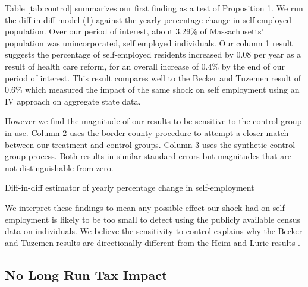 \documentclass[12pt]{article}
\begin{document}
Table \ref{tab:control} summarizes our first finding as a test of Proposition 1. We run the diff-in-diff model (1) against the yearly percentage change in self employed population. Over our period of interest, about 3.29\% of Massachusetts' population was unincorporated, self employed individuals. Our column 1 result suggests the percentage of self-employed residents increased by 0.08 per year as a result of health care reform, for an overall increase of 0.4\% by the end of our period of interest. This result compares well to the Becker and Tuzemen \cite{tuzemen} result of 0.6\% which measured the impact of the same shock on self employment using an IV approach on aggregate state data. 

However we find the magnitude of our results to be sensitive to the control group in use. Column 2 uses the border county procedure to attempt a closer match between our treatment and control groups. Column 3 uses the synthetic control group process. Both results in similar standard errors but magnitudes that are not distinguishable from zero. 
\begin{center}
	\begin{table}[H]
		\centering
			\caption{Diff-in-diff estimator of yearly percentage change in self-employment} 
			
		\label{tab:control}
	\end{table}		
\end{center}
\begin{comment}
Diff-in-diff model of health care reform from 2000 to 2012 with Massachusetts treated after 2007. Maine, Connecticut, Vermont, Rhode Island and New Hampshire used as controls in column (1). Column (2) restricts the dataset to counties that border other states across Massachusetts, Connecticut, Vermont, Rhode Island, New Hampshire and New York. Column (3) uses a synthetic control model that matches each Massachuetts county pre-trend against US counties with similar income, age, urban and insurance rate characteristics. 
\end{comment}

We interpret these findings to mean any possible effect our shock had on self-employment is likely to be too small to detect using the publicly available census data on individuals. We believe the sensitivity to control explains why the Becker and Tuzemen \cite{tuzemen} results are directionally different from the Heim and Lurie results \cite{heimLurie}. 

\subsection{No Long Run Tax Impact}
\end{document}
